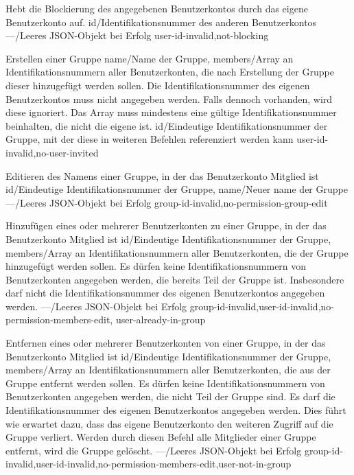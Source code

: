 \documentclass[parskip=full,11pt]{scrartcl}
\begin{document}
{Hebt die Blockierung des angegebenen Benutzerkontos durch das eigene
Benutzerkonto auf.}
{id/Identifikationsnummer des anderen Benutzerkontos}
{---/Leeres JSON-Objekt bei Erfolg}
{user-id-invalid,not-blocking}

{Erstellen einer Gruppe}
{name/Name der Gruppe,
members/Array an Identifikationsnummern aller Benutzerkonten{,} die nach
Erstellung der Gruppe dieser hinzugefügt werden sollen.
Die Identifikationsnummer des eigenen Benutzerkontos muss nicht angegeben
werden.
Falls dennoch vorhanden{,} wird diese ignoriert.
Das Array muss mindestens eine gültige Identifikationsnummer beinhalten{,} die
nicht die eigene ist.}
{id/Eindeutige Identifikationsnummer der Gruppe{,} mit der diese in
weiteren Befehlen referenziert werden kann}
{user-id-invalid,no-user-invited}

{Editieren des Namens einer Gruppe, in der das Benutzerkonto Mitglied ist}
{id/Eindeutige Identifikationsnummer der Gruppe,
name/Neuer name der Gruppe}
{---/Leeres JSON-Objekt bei Erfolg}
{group-id-invalid,no-permission-group-edit}

{Hinzufügen eines oder mehrerer Benutzerkonten zu einer Gruppe, in der das
Benutzerkonto Mitglied ist}
{id/Eindeutige Identifikationsnummer der Gruppe,
members/Array an Identifikationsnummern aller Benutzerkonten{,} die der Gruppe
hinzugefügt werden sollen.
Es dürfen keine Identifikationsnummern von Benutzerkonten angegeben werden{,}
die bereits Teil der Gruppe ist.
Insbesondere darf nicht die Identifikationsnummer des eigenen Benutzerkontos
angegeben werden.}
{---/Leeres JSON-Objekt bei Erfolg}
{group-id-invalid,user-id-invalid,no-permission-members-edit,%
user-already-in-group}

{Entfernen eines oder mehrerer Benutzerkonten von einer Gruppe, in der das
Benutzerkonto Mitglied ist}
{id/Eindeutige Identifikationsnummer der Gruppe,
members/Array an Identifikationsnummern aller Benutzerkonten{,} die aus der
Gruppe entfernt werden sollen.
Es dürfen keine Identifikationsnummern von Benutzerkonten angegeben werden{,}
die nicht Teil der Gruppe sind.
Es darf die Identifikationsnummer des eigenen Benutzerkontos angegeben werden.
Dies führt wie erwartet dazu{,} dass das eigene Benutzerkonto den weiteren
Zugriff auf die Gruppe verliert.
Werden durch diesen Befehl alle Mitglieder einer Gruppe entfernt{,} wird die
Gruppe gelöscht.}
{---/Leeres JSON-Objekt bei Erfolg}
{group-id-invalid,user-id-invalid,no-permission-members-edit,user-not-in-group}
\end{document}
